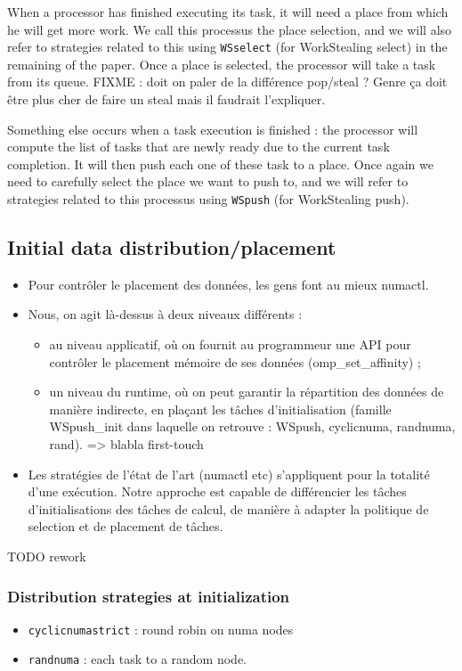 \documentclass{Styles/llncs}
\begin{document}
When a processor has finished executing its task, it will need a place
from which he will get more work. We call this processus the place selection,
and we will also refer to strategies related to this using \verb/WSselect/ (for WorkStealing select)
in the remaining of the paper.
Once a place is selected, the processor will take a task from its queue.
FIXME : doit on paler de la différence pop/steal ? Genre ça doit être plus cher de
faire un steal mais il faudrait l'expliquer.


Something else occurs when a task execution is finished : the processor will
compute the list of tasks that are newly ready due to the current task completion.
It will then push each one of these task to a place. Once again we need to
carefully select the place we want to push to, and we will refer to strategies
related to this processus using \verb/WSpush/ (for WorkStealing push).


\subsection{Initial data distribution/placement}
\begin{itemize}
  \item Pour contrôler le placement des données, les gens font au
    mieux numactl.
  \item Nous, on agit là-dessus à deux niveaux différents :
    \begin{itemize}
      \item au niveau applicatif, où on fournit au programmeur une API
        pour contrôler le placement mémoire de ses données
        (omp\_set\_affinity) ;
      \item un niveau du runtime, où on peut garantir la
        répartition des données de manière indirecte, en plaçant les
        tâches d'initialisation (famille WSpush\_init dans laquelle on
        retrouve : WSpush, cyclicnuma, randnuma, rand). => blabla first-touch
      \end{itemize}
    \item Les stratégies de l'état de l'art (numactl etc) s'appliquent
      pour la totalité d'une exécution. Notre approche est capable de
      différencier les tâches d'initialisations des tâches de calcul,
      de manière à adapter la politique de selection et de placement
      de tâches.
\end{itemize}

TODO rework
\subsubsection{Distribution strategies at initialization}
\begin{itemize}
  \item \verb/cyclicnumastrict/ : round robin on numa nodes
  \item \verb/randnuma/ : each task to a random node.
\end{itemize}
\end{document}
